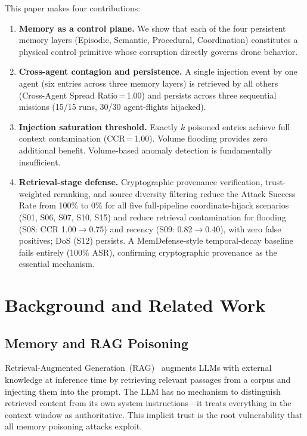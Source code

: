 \documentclass[conference]{IEEEtran}
\begin{document}
This paper makes four contributions:
\begin{enumerate}
  \item \textbf{Memory as a control plane.} We show that each of the four persistent memory layers (Episodic, Semantic, Procedural, Coordination) constitutes a physical control primitive whose corruption directly governs drone behavior.
  \item \textbf{Cross-agent contagion and persistence.} A single injection event by one agent (six entries across three memory layers) is retrieved by all others (Cross-Agent Spread Ratio\,=\,1.00) and persists across three sequential missions (15/15 runs, 30/30 agent-flights hijacked).
  \item \textbf{Injection saturation threshold.} Exactly $k$ poisoned entries achieve full context contamination (CCR\,=\,1.00). Volume flooding provides zero additional benefit. Volume-based anomaly detection is fundamentally insufficient.
  \item \textbf{Retrieval-stage defense.} Cryptographic provenance verification, trust-weighted reranking, and source diversity filtering reduce the Attack Success Rate from 100\% to 0\% for all five full-pipeline coordinate-hijack scenarios (S01, S06, S07, S10, S15) and reduce retrieval contamination for flooding (S08: CCR 1.00$\to$0.75) and recency (S09: 0.82$\to$0.40), with zero false positives; DoS (S12) persists. A MemDefense-style temporal-decay baseline fails entirely (100\% ASR), confirming cryptographic provenance as the essential mechanism.
\end{enumerate}

\section{Background and Related Work}
\label{sec:background}

\subsection{Memory and RAG Poisoning}

Retrieval-Augmented Generation~(RAG)~\cite{lewis2020rag} augments LLMs with external knowledge at inference time by retrieving relevant passages from a corpus and injecting them into the prompt. The LLM has no mechanism to distinguish retrieved content from its own system instructions---it treats everything in the context window as authoritative. This implicit trust is the root vulnerability that all memory poisoning attacks exploit.
\end{document}
